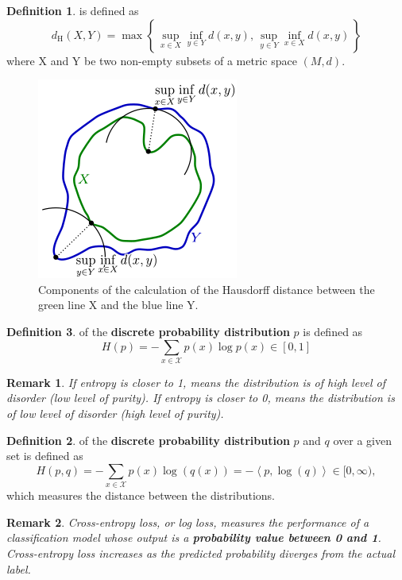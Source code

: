 \documentclass[a4paper]{article}
\theoremstyle{definition}
\newtheorem{definition}{Definition}
\theoremstyle{plain}
\newtheorem{remark}{Remark}
\begin{document}
\begin{definition}
 is defined as 
\begin{equation*}
     d_{\mathrm {H} }(X,Y)=\max \left\{\,\sup _{x\in X}\inf _{y\in Y}d(x,y),\,\sup _{y\in Y}\inf _{x\in X}d(x,y)\,\right\}
\end{equation*}
where X and Y be two non-empty subsets of a metric space $(M,d)$.
\end{definition}

\begin{figure}[H]
    \centering
    \includegraphics[scale=0.6]{figure/hausdorff.png}
    \caption{Components of the calculation of the Hausdorff distance between the green line X and the blue line Y.}
\end{figure}

\begin{definition}
 of the \textbf{discrete probability distribution} $p$ is defined as
\begin{equation*}
   H(p)=-\sum _{x\in {\mathcal {X}}}{p (x)\log p (x)} \in[0,1]
\end{equation*}

\begin{remark}
If entropy is closer to 1, means the distribution is of high level of disorder (low level of purity). If entropy is closer to 0, means the distribution is of low level of disorder (high level of purity).
\end{remark}

\begin{definition}
 of the \textbf{discrete probability distribution} $p$ and $q$ over a given set is defined as 
\begin{equation*}
    H(p,q)=-\sum_{x\in {\mathcal {X}}} p(x)\log(q(x))=-\left<p,\log(q)\right>\in[0,\infty),
\end{equation*}
which measures the distance between the distributions.
\end{definition}

\begin{remark}
Cross-entropy loss, or log loss, measures the performance of a classification model whose output is a \textbf{probability value between 0 and 1}. Cross-entropy loss increases as the predicted probability diverges from the actual label. 
\end{remark}

\end{definition}
\end{document}
